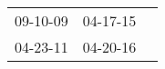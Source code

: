 \begin{supertabular}{p{0.33\columnwidth}p{0.33\columnwidth}p{0.33\columnwidth}}
 09-10-09\textsuperscript{} &  04-17-15\textsuperscript{} \\
 04-23-11\textsuperscript{} &  04-20-16\textsuperscript{} \\
\end{supertabular}
